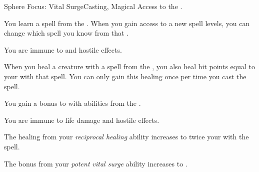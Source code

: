     \begin{feat}{Sphere Focus: Vital Surge}{Casting, Magical}
        \featpre Access to the  .

         You learn a spell from the  .
        When you gain access to a new spell levels, you can change which spell you know from that .

         You are immune to  and hostile  effects.

         When you heal a creature with a spell from the  , you also heal hit points equal to your  with that spell.
        You can only gain this healing once per time you cast the spell.

         You gain a  bonus to  with abilities from the  .

         You are immune to life damage and hostile  effects.

         The healing from your \textit{reciprocal healing} ability increases to twice your  with the spell.

         The bonus from your \textit{potent vital surge} ability increases to .
    \end{feat}

